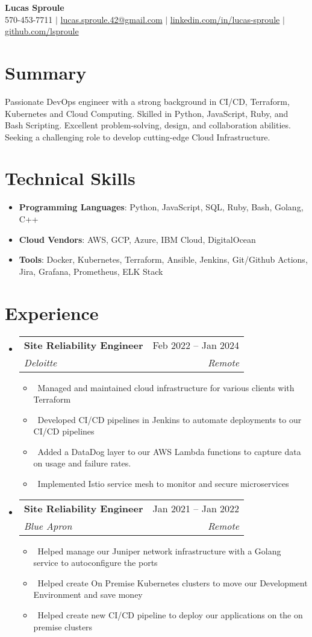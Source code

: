 \documentclass[letterpaper,10pt]{article}
\makeatletter
\newcommand{\resumeItem}[1]{\item\small{#1}}
\newcommand{\resumeSubheading}[4]{
\vspace{-1pt}\item
  \begin{tabular*}{0.97\textwidth}[t]{l@{\extracolsep{\fill}}r}
    \textbf{#1} & #2 \\
    \textit{#3} & \textit{#4} \\
  \end{tabular*}\vspace{-7pt}
}
\newcommand{\resumeSubHeadingList}{\begin{itemize}[leftmargin=0.15in, label={}]}
\newcommand{\resumeSubHeadingListEnd}{\end{itemize}}
\makeatother
\begin{document}
\begin{center}
  \textbf{\Huge Lucas Sproule} \\
  \small 570-453-7711 $|$ \href{mailto:lucas.sproule.42@gmail.com}{lucas.sproule.42@gmail.com} $|$ 
  \href{https://linkedin.com/in/lucas-sproule}{linkedin.com/in/lucas-sproule} $|$
  \href{https://github.com/lsproule}{github.com/lsproule}
\end{center}

\section*{Summary}
Passionate DevOps engineer with a strong background in CI/CD, Terraform, Kubernetes and Cloud Computing. Skilled in Python, JavaScript, Ruby, and Bash Scripting. Excellent problem-solving, design, and collaboration abilities. Seeking a challenging role to develop cutting-edge Cloud Infrastructure.

\section{Technical Skills}
\resumeSubHeadingList
  \resumeItem{\textbf{Programming Languages}: Python, JavaScript, SQL, Ruby, Bash, Golang, C++}
  \resumeItem{\textbf{Cloud Vendors}: AWS, GCP, Azure, IBM Cloud, DigitalOcean}
  \resumeItem{\textbf{Tools}: Docker, Kubernetes, Terraform, Ansible, Jenkins, Git/Github Actions, Jira, Grafana, Prometheus, ELK Stack}
\resumeSubHeadingListEnd



\section{Experience}
\resumeSubHeadingList
  \resumeSubheading
      {Site Reliability Engineer}{Feb 2022 -- Jan 2024}
      {Deloitte}{Remote}
      \resumeSubHeadingList
          \resumeItem{\textbullet\ Managed and maintained cloud infrastructure for various clients with Terraform}
          \resumeItem{\textbullet\ Developed CI/CD pipelines in Jenkins to automate deployments to our CI/CD pipelines}
          \resumeItem{\textbullet\ Added a DataDog layer to our AWS Lambda functions to capture data on usage and failure rates.}
          \resumeItem{\textbullet\ Implemented Istio service mesh to monitor and secure microservices}

      \resumeSubHeadingListEnd
  \resumeSubheading
      {Site Reliability Engineer}{Jan 2021 -- Jan 2022}
      {Blue Apron}{Remote}
      \resumeSubHeadingList
          \resumeItem{\textbullet\ Helped manage our Juniper network infrastructure with a Golang service to autoconfigure the ports}
          \resumeItem{\textbullet\ Helped create On Premise Kubernetes clusters to move our Development Environment and save money}
          \resumeItem{\textbullet\ Helped create new CI/CD pipeline to deploy our applications on the on premise clusters}
      \resumeSubHeadingListEnd
\resumeSubHeadingListEnd
\end{document}
